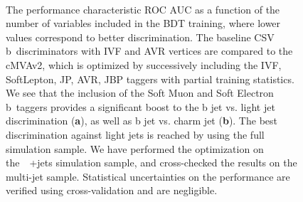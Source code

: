 \begin{figure}
\begin{centering}
 \\
\caption[The cMVAv2 performance as a function of training variables.]{The performance characteristic ROC AUC as a function of the number of variables included in the BDT training, where lower values correspond to better discrimination. The baseline CSV b~discriminators with IVF and AVR vertices are compared to the cMVAv2, which is optimized by successively including the IVF, SoftLepton, JP, AVR, JBP taggers with partial training statistics. We see that the inclusion of the Soft Muon and Soft Electron b~taggers provides a significant boost to the b jet vs. light jet discrimination (\textbf{a}), as well as b jet vs. charm jet (\textbf{b}). The best discrimination against light jets is reached by using the full simulation sample. We have performed the optimization on the~\ttbar~+jets simulation sample, and cross-checked the results on the multi-jet sample. Statistical uncertainties on the performance are verified using cross-validation and are negligible.}
\label{fig:btag_cmva_roc}
\end{centering}
\end{figure}

